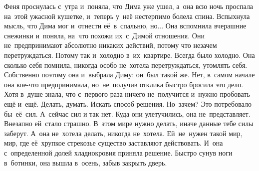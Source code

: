 Феня проснулась с~утра и~поняла, что Дима уже ушел, а~она всю ночь проспала на~этой ужасной кушетке, и~теперь у~неё нестерпимо болела спина.
Вспыхнула мысль, что Дима мог и~отнести её~в~спальню, но... Она вспомнила вчерашние снежинки и~поняла, на~что похожи их~с~Димой отношения.
Они не~предпринимают абсолютно никаких действий, потому что незачем перетруждаться.
Потому так и~холодно в~их~квартире.
Всегда было холодно.
Она сколько себя помнила, никогда особо не~хотела перетруждаться, утомлять себя.
Собственно поэтому она и~выбрала Диму: он~был такой же.
Нет, в~самом начале она кое-что предпринимала, но~не~получив отклика быстро бросила это дело.
Хотя в~душе знала, что с~первого раза ничего не~получится и~нужно пробовать ещё и~ещё.
Делать, думать.
Искать способ решения.
Но~зачем? Это потребовало бы~её~сил.
А~сейчас сил и так нет.
Куда они улетучились, она не~представляет.
Внезапно ей~стало страшно.
В~этом мире нужно делать, иначе данные тебе силы заберут.
А~она не~хотела делать, никогда не~хотела.
Ей~не~нужен такой мир, мир, где её~хрупкое стрекозье существо заставляют действовать.
И~она с~определенной долей хладнокровия приняла решение.
Быстро сунув ноги в~ботинки, она вышла в~осень, забыв закрыть дверь.







